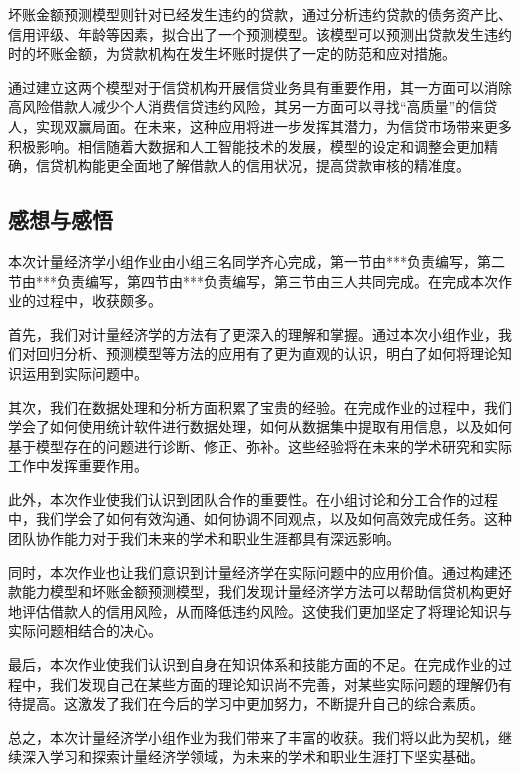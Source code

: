 \documentclass[13.5pt,hyperref,a4paper,UTF8]{ctexart}
\begin{document}
坏账金额预测模型则针对已经发生违约的贷款，通过分析违约贷款的债务资产比、信用评级、年龄等因素，拟合出了一个预测模型。该模型可以预测出贷款发生违约时的坏账金额，为贷款机构在发生坏账时提供了一定的防范和应对措施。

通过建立这两个模型对于信贷机构开展信贷业务具有重要作用，其一方面可以消除高风险借款人减少个人消费信贷违约风险，其另一方面可以寻找“高质量”的信贷人，实现双赢局面。在未来，这种应用将进一步发挥其潜力，为信贷市场带来更多积极影响。相信随着大数据和人工智能技术的发展，模型的设定和调整会更加精确，信贷机构能更全面地了解借款人的信用状况，提高贷款审核的精准度。

\subsection{感想与感悟}

本次计量经济学小组作业由小组三名同学齐心完成，第一节由***负责编写，第二节由***负责编写，第四节由***负责编写，第三节由三人共同完成。在完成本次作业的过程中，收获颇多。

首先，我们对计量经济学的方法有了更深入的理解和掌握。通过本次小组作业，我们对回归分析、预测模型等方法的应用有了更为直观的认识，明白了如何将理论知识运用到实际问题中。

其次，我们在数据处理和分析方面积累了宝贵的经验。在完成作业的过程中，我们学会了如何使用统计软件进行数据处理，如何从数据集中提取有用信息，以及如何基于模型存在的问题进行诊断、修正、弥补。这些经验将在未来的学术研究和实际工作中发挥重要作用。

此外，本次作业使我们认识到团队合作的重要性。在小组讨论和分工合作的过程中，我们学会了如何有效沟通、如何协调不同观点，以及如何高效完成任务。这种团队协作能力对于我们未来的学术和职业生涯都具有深远影响。

同时，本次作业也让我们意识到计量经济学在实际问题中的应用价值。通过构建还款能力模型和坏账金额预测模型，我们发现计量经济学方法可以帮助信贷机构更好地评估借款人的信用风险，从而降低违约风险。这使我们更加坚定了将理论知识与实际问题相结合的决心。

最后，本次作业使我们认识到自身在知识体系和技能方面的不足。在完成作业的过程中，我们发现自己在某些方面的理论知识尚不完善，对某些实际问题的理解仍有待提高。这激发了我们在今后的学习中更加努力，不断提升自己的综合素质。

总之，本次计量经济学小组作业为我们带来了丰富的收获。我们将以此为契机，继续深入学习和探索计量经济学领域，为未来的学术和职业生涯打下坚实基础。




\newpage
{}

\thispagestyle{empty} %
\end{document}
